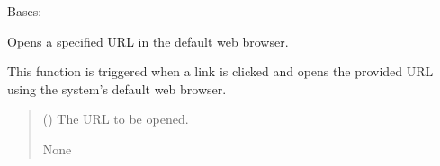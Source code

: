 \documentclass[letterpaper,10pt,english]{sphinxmanual}
\begin{document}
\begin{fulllineitems}
\label{\detokenize{aboutDialog:aboutDialog.Ui_AboutDialog}}
\pysigstartsignatures
{}
\pysigstopsignatures
\sphinxAtStartPar
Bases: 

\begin{fulllineitems}
\label{\detokenize{aboutDialog:aboutDialog.Ui_AboutDialog.acceptButton}}
\pysigstartsignatures
{}
\pysigstopsignatures
\end{fulllineitems}


\begin{fulllineitems}
\label{\detokenize{aboutDialog:aboutDialog.Ui_AboutDialog.open_link}}
\pysigstartsignatures
{}
\pysigstopsignatures
\sphinxAtStartPar
Opens a specified URL in the default web browser.

\sphinxAtStartPar
This function is triggered when a link is clicked and opens the provided URL 
using the system’s default web browser.
\begin{quote}\begin{description}
\sphinxAtStartPar
{} () \textendash{} The URL to be opened.

\sphinxAtStartPar
None

\end{description}\end{quote}

\end{fulllineitems}


\begin{fulllineitems}
\label{\detokenize{aboutDialog:aboutDialog.Ui_AboutDialog.setupUi}}
\pysigstartsignatures
{}
\pysigstopsignatures
\end{fulllineitems}


\end{fulllineitems}
\end{document}
